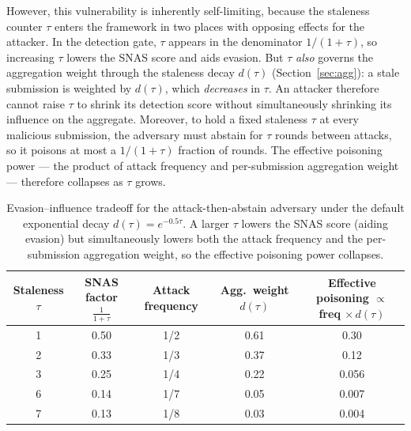 %
%
%

However, this vulnerability is inherently self-limiting, because the staleness counter $\tau$ enters the framework in two places with opposing effects for the attacker. In the detection gate, $\tau$ appears in the denominator $1/(1+\tau)$, so increasing $\tau$ lowers the SNAS score and aids evasion. But $\tau$ \emph{also} governs the aggregation weight through the staleness decay $d(\tau)$ (Section~\ref{sec:agg}): a stale submission is weighted by $d(\tau)$, which \emph{decreases} in $\tau$. An attacker therefore cannot raise $\tau$ to shrink its detection score without simultaneously shrinking its influence on the aggregate. Moreover, to hold a fixed staleness $\tau$ at every malicious submission, the adversary must abstain for $\tau$ rounds between attacks, so it poisons at most a $1/(1+\tau)$ fraction of rounds. The effective poisoning power --- the product of attack frequency and per-submission aggregation weight --- therefore collapses as $\tau$ grows.

\begin{table}[t]
\caption{Evasion--influence tradeoff for the attack-then-abstain adversary under the default exponential decay $d(\tau)=e^{-0.5\tau}$. A larger $\tau$ lowers the SNAS score (aiding evasion) but simultaneously lowers both the attack frequency and the per-submission aggregation weight, so the effective poisoning power collapses.}
\label{tab:tradeoff}
\centering
\begin{tabular}{ccccc}
\toprule
Staleness $\tau$ & SNAS factor $\tfrac{1}{1+\tau}$ & Attack frequency & Agg.\ weight $d(\tau)$ & Effective poisoning $\propto$ freq $\times\, d(\tau)$ \\
\midrule
1 & 0.50 & 1/2 & 0.61 & 0.30 \\
2 & 0.33 & 1/3 & 0.37 & 0.12 \\
3 & 0.25 & 1/4 & 0.22 & 0.056 \\
6 & 0.14 & 1/7 & 0.05 & 0.007 \\
7 & 0.13 & 1/8 & 0.03 & 0.004 \\
\bottomrule
\end{tabular}
\end{table}

